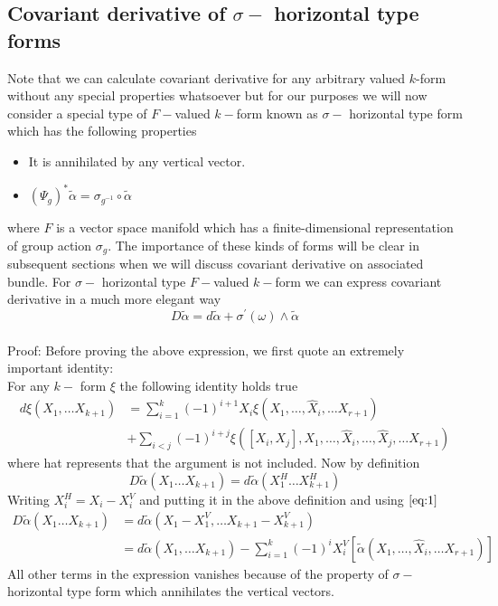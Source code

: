 \documentclass[12pt]{article}
\begin{document}
\subsection{Covariant derivative of $\sigma-$ horizontal type forms}
Note that we can calculate covariant derivative for any arbitrary valued $k$-form without any special properties whatsoever but for our purposes we will now consider a special type of $F-$valued $k-$form known as $\sigma-$ horizontal type form which has the following properties
\begin{itemize}
    \item It is annihilated by any vertical vector.
    \item $(\Psi_{g})^{\ast}\tilde{\alpha} = \sigma_{g^{-1}}\circ\tilde{\alpha}$
\end{itemize} where $F$ is a vector space manifold which has a finite-dimensional representation of group action $\sigma_{g}$. The importance of these kinds of forms will be clear in subsequent sections when we will discuss covariant derivative on associated bundle. For $\sigma-$ horizontal type $F-$valued $k-$form we can express covariant derivative in a much more elegant way 
\begin{equation}\label{eq:9}
    D\tilde{\alpha} = d\tilde{\alpha} + \sigma^{\prime}(\omega)\wedge \tilde{\alpha}
\end{equation} \\
Proof:
Before proving the above expression, we first quote an extremely important identity: \\
For any $k-$ form $\xi$ the following identity holds true
\begin{equation}\label{eq:1}
    \begin{split}
d\xi(X_{1}, \dots X_{k+1}) &= \sum^{k}_{i=1}(-1)^{i+1}X_{i}\xi(X_{1}, \dots, \hat{X}_{i}, \dots X_{r+1}) \\
& + \sum_{i < j}(-1)^{i+j}\xi([X_{i}, X_{j}], X_{1}, \dots, \hat{X}_{i}, \dots, \hat{X}_{j}, \dots X_{r+1})
\end{split}
\end{equation} where hat represents that the argument is not included.
Now by definition 
\begin{equation*}
    D\tilde{\alpha}(X_{1}\dots X_{k+1}) = d\tilde{\alpha}(X^{H}_{1}\dots X^{H}_{k+1})
\end{equation*}Writing $X^{H}_{i} = X_{i} - X^{V}_{i}$ and putting it in the above definition and using $\ref{eq:1}$
\begin{align*}
    D\tilde{\alpha}(X_{1}\dots X_{k+1}) &= d\tilde{\alpha}(X_{1} - X^{V}_{1}, \dots X_{k+1} - X^{V}_{k+1}) \\
                                        &= d\tilde{\alpha}(X_{1}, \dots X_{k+1}) - \sum^{k}_{i=1}(-1)^{i}X^{V}_{i}[\tilde{\alpha}(X_{1}, \dots, \hat{X}_{i}, \dots X_{r+1})]
\end{align*} All other terms in the expression vanishes because of the property of $\sigma-$ horizontal type form which annihilates the vertical vectors. \\
\end{document}
